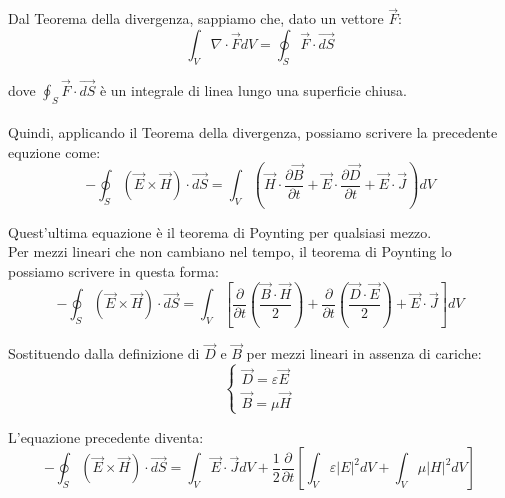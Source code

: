 Dal Teorema della divergenza, sappiamo che, dato un vettore $\vec{F}$: \\ 

{
    \Large 
    \begin{equation}
    \int_V \nabla \cdot \vec{F} dV = \oint_S \vec{F} \cdot \vec{dS}       
    \end{equation}
}

dove $\oint_S \vec{F} \cdot \vec{dS}$ è un integrale di linea lungo una superficie chiusa. \\ \\ 

Quindi, applicando il Teorema della divergenza, possiamo scrivere la precedente equzione come: \\ 

{
    \Large
    \begin{equation}
    - \oint_S (\vec{E} \times \vec{H}) \cdot \vec{dS} = \int_V  (\vec{H} \cdot \frac{\partial \vec{B}}{\partial t} + \vec{E} \cdot \frac{\partial \vec{D}}{\partial t} + \vec{E} \cdot \vec{J}) dV     
    \end{equation}
}

Quest'ultima equazione è il teorema di Poynting per qualsiasi mezzo. \\

Per mezzi lineari che non cambiano nel tempo, il teorema di Poynting lo possiamo scrivere in questa forma: 
{
    \Large
    \begin{equation}
    - \oint_S (\vec{E} \times \vec{H}) \cdot \vec{dS} = \int_V [\frac{\partial}{\partial t} (\frac{\vec{B} \cdot \vec{H}}{2}) + \frac{\partial}{\partial t} (\frac{\vec{D} \cdot \vec{E}}{2}) + \vec{E} \cdot \vec{J} ] dV       
    \end{equation}
}

Sostituendo dalla definizione di $\vec{D}$ e $\vec{B}$ per mezzi lineari in assenza di cariche: 
{
    \Large
    \begin{equation}
        \begin{cases}
\vec{D} = \varepsilon \vec{E}\\ 
\vec{B} = \mu \vec{H}         
        \end{cases}
    \end{equation}
}

L'equazione precedente diventa: 
{
    \Large
    \begin{equation}
    - \oint_S (\vec{E} \times \vec{H}) \cdot \vec{dS} = \int_V \vec{E} \cdot \vec{J} dV + \frac{1}{2} \frac{\partial}{\partial t} [\int_V \varepsilon \left| E \right| ^{2} dV + \int_V \mu \left| H \right| ^{2} dV ]        
    \end{equation}
} 

